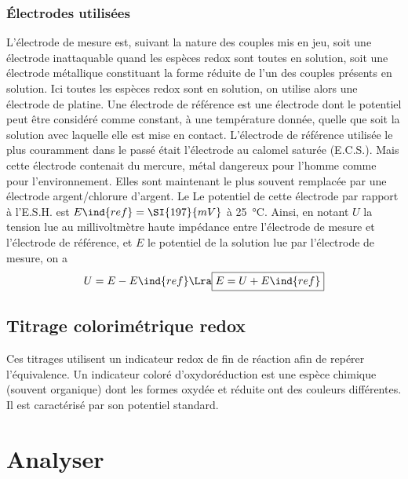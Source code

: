 \documentclass[../main/main.tex]{subfiles}
\begin{document}
{	\subsubsection{Électrodes utilisées}
	L'électrode de mesure est, suivant la nature des couples mis en jeu, soit une
	électrode inattaquable quand les espèces redox sont toutes en solution, soit une
	électrode métallique constituant la forme réduite de l'un des couples présents
	en solution. Ici toutes les espèces redox sont en solution, on utilise alors une
	électrode de platine.
	\bigbreak
	Une électrode de référence est une électrode dont le potentiel peut être
	considéré comme constant, à une température donnée, quelle que soit la solution
	avec laquelle elle est mise en contact. L'électrode de référence utilisée le
	plus couramment dans le passé était l'électrode au calomel saturée (E.C.S.).
	Mais cette électrode contenait du mercure, métal dangereux pour l'homme comme
	pour l'environnement. Elles sont maintenant le plus souvent remplacée par une
	électrode argent/chlorure d'argent. Le
	\bigbreak
	Le potentiel de cette électrode par rapport à l'E.S.H. est $E\ind{ref} =
		\SI{197}{mV}$ à \SI{25}{\degreeCelsius}. Ainsi, en notant $U$ la tension lue au
	millivoltmètre haute impédance entre l'électrode de mesure et l'électrode de
	référence, et $E$ le potentiel de la solution lue par l'électrode de mesure, on
	a
	\[
		U = E - E\ind{ref}
		\Lra
		\boxed{E = U + E\ind{ref}}
	\]

	\subsection{Titrage colorimétrique redox}
	Ces titrages utilisent un indicateur redox de fin de réaction afin de repérer
	l'équivalence. Un indicateur coloré d'oxydoréduction est une espèce chimique
	(souvent organique) dont les formes oxydée et réduite ont des couleurs
	différentes. Il est caractérisé par son potentiel standard.
}%

\setcounter{section}{2}
\section{Analyser}
\end{document}
